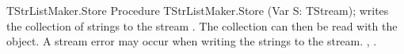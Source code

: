 \begin{procedure}{TStrListMaker.Store}
\Declaration
Procedure TStrListMaker.Store (Var S: TStream);
\Description
{} writes the collection of strings to the stream .
The collection can then be read with the  object.
\Errors
A stream error may occur when writing the strings to the stream.
\SeeAlso
{}, .
\end{procedure}


